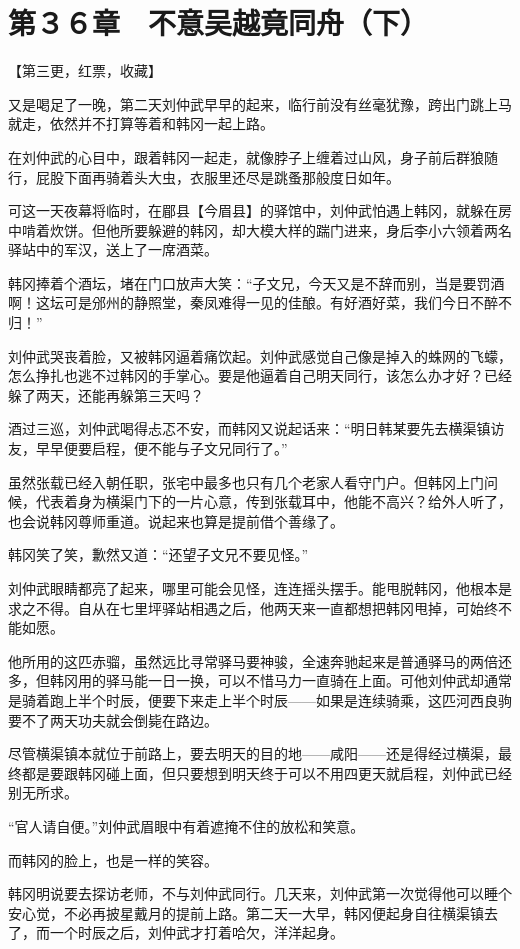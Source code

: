 \section{第３６章　不意吴越竟同舟（下）}

【第三更，红票，收藏】

又是喝足了一晚，第二天刘仲武早早的起来，临行前没有丝毫犹豫，跨出门跳上马就走，依然并不打算等着和韩冈一起上路。

在刘仲武的心目中，跟着韩冈一起走，就像脖子上缠着过山风，身子前后群狼随行，屁股下面再骑着头大虫，衣服里还尽是跳蚤那般度日如年。

可这一天夜幕将临时，在郿县【今眉县】的驿馆中，刘仲武怕遇上韩冈，就躲在房中啃着炊饼。但他所要躲避的韩冈，却大模大样的踹门进来，身后李小六领着两名驿站中的军汉，送上了一席酒菜。

韩冈捧着个酒坛，堵在门口放声大笑：“子文兄，今天又是不辞而别，当是要罚酒啊！这坛可是邠州的静照堂，秦凤难得一见的佳酿。有好酒好菜，我们今日不醉不归！”

刘仲武哭丧着脸，又被韩冈逼着痛饮起。刘仲武感觉自己像是掉入的蛛网的飞蠓，怎么挣扎也逃不过韩冈的手掌心。要是他逼着自己明天同行，该怎么办才好？已经躲了两天，还能再躲第三天吗？

酒过三巡，刘仲武喝得忐忑不安，而韩冈又说起话来：“明日韩某要先去横渠镇访友，早早便要启程，便不能与子文兄同行了。”

虽然张载已经入朝任职，张宅中最多也只有几个老家人看守门户。但韩冈上门问候，代表着身为横渠门下的一片心意，传到张载耳中，他能不高兴？给外人听了，也会说韩冈尊师重道。说起来也算是提前借个善缘了。

韩冈笑了笑，歉然又道：“还望子文兄不要见怪。”

刘仲武眼睛都亮了起来，哪里可能会见怪，连连摇头摆手。能甩脱韩冈，他根本是求之不得。自从在七里坪驿站相遇之后，他两天来一直都想把韩冈甩掉，可始终不能如愿。

他所用的这匹赤骝，虽然远比寻常驿马要神骏，全速奔驰起来是普通驿马的两倍还多，但韩冈用的驿马能一日一换，可以不惜马力一直骑在上面。可他刘仲武却通常是骑着跑上半个时辰，便要下来走上半个时辰——如果是连续骑乘，这匹河西良驹要不了两天功夫就会倒毙在路边。

尽管横渠镇本就位于前路上，要去明天的目的地——咸阳——还是得经过横渠，最终都是要跟韩冈碰上面，但只要想到明天终于可以不用四更天就启程，刘仲武已经别无所求。

“官人请自便。”刘仲武眉眼中有着遮掩不住的放松和笑意。

而韩冈的脸上，也是一样的笑容。

韩冈明说要去探访老师，不与刘仲武同行。几天来，刘仲武第一次觉得他可以睡个安心觉，不必再披星戴月的提前上路。第二天一大早，韩冈便起身自往横渠镇去了，而一个时辰之后，刘仲武才打着哈欠，洋洋起身。

